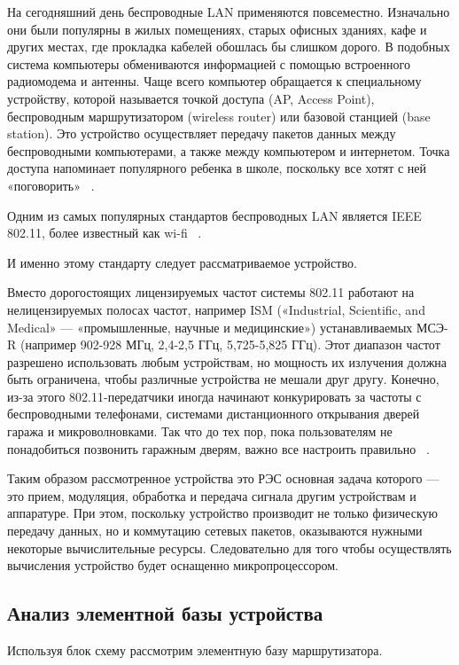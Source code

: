 На сегодняшний день беспроводные LAN применяются
повсеместно. Изначально они были популярны в жилых помещениях, старых
офисных зданиях, кафе и других местах, где прокладка кабелей обошлась
бы слишком дорого. В подобных система компьютеры обмениваются
информацией с помощью встроенного радиомодема и антенны. Чаще всего
компьютер обращается к специальному устройству, которой называется
точкой доступа (AP, Access Point), беспроводным маршрутизатором
(wireless router) или базовой станцией (base station). Это устройство
осуществляет передачу пакетов данных между беспроводными компьютерами,
а также между компьютером и интернетом. Точка доступа напоминает
популярного ребенка в школе, поскольку все хотят с ней «поговорить»
~\cite{NetworksTanenbaum2023}.

Одним из самых популярных стандартов беспроводных LAN является IEEE
802.11, более известный как wi-fi ~\cite{NetworksTanenbaum2023}.

И именно этому стандарту следует рассматриваемое устройство.

Вместо дорогостоящих лицензируемых частот системы 802.11 работают на
нелицензируемых полосах частот, например ISM («Industrial, Scientific,
and Medical» — «промышленные, научные и медицинские») устанавливаемых
МСЭ-R (например 902-928 МГц, 2,4-2,5 ГГц, 5,725-5,825 ГГц).  Этот
диапазон частот разрешено использовать любым устройствам, но мощность
их излучения должна быть ограничена, чтобы различные устройства не
мешали друг другу. Конечно, из-за этого 802.11-передатчики иногда
начинают конкурировать за частоты с беспроводными телефонами,
системами дистанционного открывания дверей гаража и микроволновками.
Так что до тех пор, пока пользователям не понадобиться позвонить
гаражным дверям, важно все настроить
правильно ~\cite{NetworksTanenbaum2023}.

Таким образом рассмотренное устройства это РЭС основная задача
которого — это прием, модуляция, обработка и передача сигнала другим
устройствам и аппаратуре. При этом, поскольку устройство производит не
только физическую передачу данных, но и коммутацию сетевых пакетов,
оказываются нужными некоторые вычислительные ресурсы.
Следовательно для того чтобы осуществлять вычисления устройство будет
оснащенно микропроцессором.

\subsection{Анализ элементной базы устройства}

Используя блок схему рассмотрим элементную базу
маршрутизатора.


